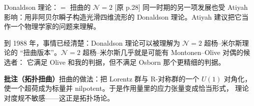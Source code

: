 \documentclass[aspectratio=169,12pt]{ctexbeamer}
\newcommand{\cN}{\mathcal{N}}
\newcommand{\srcp}[1]{{\color{black!40}\scriptsize[原 p.#1]}}
\begin{document}
\begin{frame}{Donaldson 理论：$=$ 扭曲的 $\cN=2$}
  \srcp{28} 同一时期的另一项发展也受 Atiyah 影响：用非阿贝尔瞬子构造光滑四维流形的
  Donaldson 理论。Atiyah 建议把它当作一个物理学家的问题来理解。
  \vspace{0.4em}

  到 1988 年，事情已经清楚：Donaldson 理论可以被理解为 $\cN=2$ 超杨--米尔斯理论的
  “扭曲版本”。$\cN=2$ 超杨--米尔斯几乎就是可能有 Montonen--Olive 对偶的候选者：
  它满足 Olive 和我的判据，但不满足 Osborn 那个更精细的判据。
  \begin{beizhu}
  \textbf{批注（拓扑扭曲）}\quad 扭曲的做法：把 Lorentz 群与 R-对称群的一个 $U(1)$
  对角化，使一个超荷成为标量并 nilpotent。于是作用量里的应力张量变成恰当形式，
  理论对度规不敏感——这正是拓扑场论。
  \end{beizhu}
\end{frame}




\end{document}
